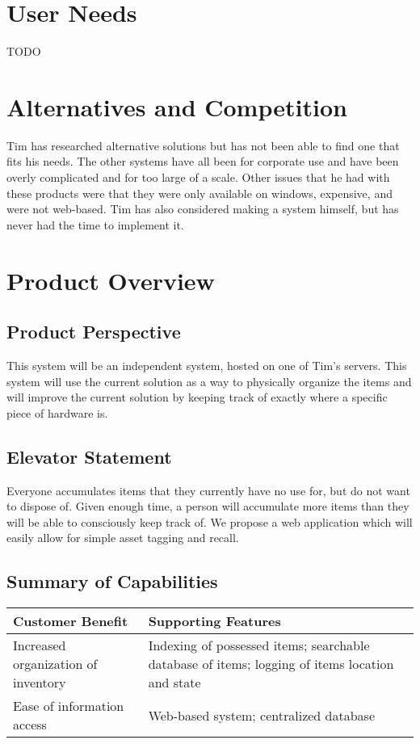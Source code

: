 \documentclass{article}
\begin{document}
\section{User Needs}
TODO
\section{Alternatives and Competition}
Tim has researched alternative solutions but has not been able to find one that fits his needs.  The other systems have all been for corporate use and have been overly complicated and for too large of a scale.  Other issues that he had with these products were that they were only available on windows, expensive, and were not web-based.  Tim has also considered making a system himself, but has never had the time to implement it.

\section{Product Overview}
\subsection{Product Perspective}
This system will be an independent system, hosted on one of Tim’s servers.  This system will use the current solution as a way to physically organize the items and will improve the current solution by keeping track of exactly where a specific piece of hardware is.
\subsection{Elevator Statement}
Everyone accumulates items that they currently have no use for, but do not want to dispose of.  Given enough time, a person will accumulate more items than they will be able to consciously keep track of. We propose a web application which will easily allow for simple asset tagging and recall.

\subsection{Summary of Capabilities}
\begin{tabular}{ | p{2.5in} | p{3.5in} | }
\hline
Customer Benefit & Supporting Features\\
\hline
Increased organization of inventory & Indexing of possessed items; searchable database of items; logging of items location and state\\
\hline
Ease of information access & Web-based system; centralized database\\
\hline
\end{tabular}
\end{document}
